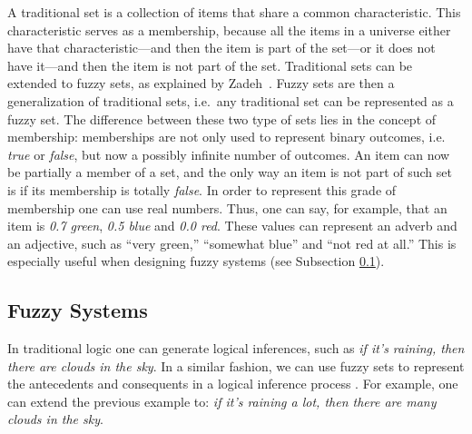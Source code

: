 \documentclass{ieeeaccess}
\begin{document}
A traditional set is a collection of items that share a common
characteristic. This characteristic serves as a membership, because all the
items in a universe either have that characteristic---and then the item is
part of the set---or it does not have it---and then the item is not part of
the set. Traditional sets can be extended to fuzzy sets, as explained by
Zadeh~\cite{Zadeh1965}. %
Fuzzy sets are then a generalization of traditional sets,
i.e.\ any traditional set can be represented as a fuzzy set. The difference
between these two type of sets lies in the concept of membership: memberships
are not only used to represent binary outcomes, i.e. \textit{true} or
\textit{false}, but now a possibly infinite number of outcomes. An item can now
be partially a member of a set, and the only way an item is not part of such set
is if its membership is totally \textit{false}. In order to represent this grade
of membership one can use real numbers. Thus, one can say, for example, that an
item is \textit{0.7 green}, \textit{0.5 blue} and \textit{0.0 red}. These values
can represent an adverb and an adjective, such as ``very green,'' ``somewhat
blue'' and ``not red at all.'' This is especially useful when designing fuzzy
systems (see Subsection \ref{subsection:fuzzy-systems}).

\subsection{Fuzzy Systems}
\label{subsection:fuzzy-systems}


In traditional logic one can generate logical inferences, such as \textit{if
it's raining, then there are clouds in the sky}. In a similar fashion, we can
use fuzzy sets to represent the antecedents and consequents in a logical
inference process \cite{kruse1994foundations}. For example, one can extend the previous example to:
\textit{if it's raining a lot, then there are many clouds in the sky}.
\end{document}

